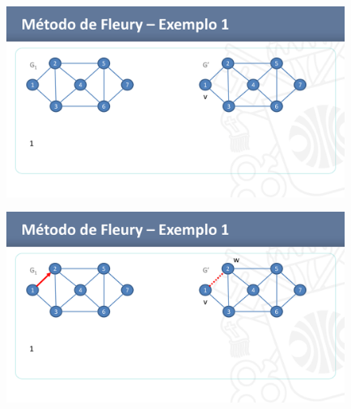     \label{fig:PassoPasso}
    \begin{subfigure}{.4\textwidth}
		\includegraphics[width=\textwidth]{imagem/graficos/1a1455b7b9174768d1c6a0d41673e79dHTztESkzBtQzsXWu-25.png}
	\end{subfigure}
    \begin{subfigure}{.4\textwidth}
		\includegraphics[width=\textwidth]{imagem/graficos/1a1455b7b9174768d1c6a0d41673e79dHTztESkzBtQzsXWu-26.png}
	\end{subfigure}
